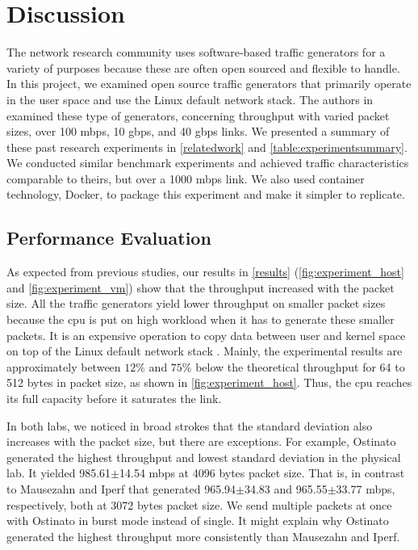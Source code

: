 \chapter{Discussion}\label{discussion}

The network research community uses software-based traffic generators for a variety of purposes because these are often open sourced and flexible to handle.
In this project, we examined open source traffic generators that primarily operate in the user space and use the Linux default network stack.
The authors in \cite{kolahi2011performance, srivastava2014evaluation, srivastava2014comparative} examined these type of generators, concerning throughput with varied packet sizes, over 100 \acrshort{mbps}, 10 \acrshort{gbps}, and 40 \acrshort{gbps} links.
We presented a summary of these past research experiments in \cref{relatedwork} and \cref{table:experimentsummary}.
We conducted similar benchmark experiments and achieved traffic characteristics comparable to theirs, but over a 1000 \acrshort{mbps} link.
We also used container technology, Docker, to package this experiment and make it simpler to replicate.

\section{Performance Evaluation}

As expected from previous studies, our results in \cref{results} (\cref{fig:experiment_host} and \cref{fig:experiment_vm}) show that the throughput increased with the packet size.
All the traffic generators yield lower throughput on smaller packet sizes because the \acrshort{cpu} is put on high workload when it has to generate these smaller packets.
It is an expensive operation to copy data between user and kernel space on top of the Linux default network stack \cite{raumer2015performance}.
Mainly, the experimental results are approximately between $12\%$ and $75\%$ below the theoretical throughput for 64 to 512 bytes in packet size, as shown in \cref{fig:experiment_host}.
Thus, the \acrshort{cpu} reaches its full capacity before it saturates the link.

\skippara In both labs, we noticed in broad strokes that the standard deviation also increases with the packet size, but there are exceptions.
For example, Ostinato generated the highest throughput and lowest standard deviation in the physical lab.
It yielded 985.61$\pm$14.54 \acrshort{mbps} at 4096 bytes packet size.
That is, in contrast to Mausezahn and Iperf that generated 965.94$\pm$34.83 and 965.55$\pm$33.77 \acrshort{mbps}, respectively, both at 3072 bytes packet size.
We send multiple packets at once with Ostinato in burst mode instead of single.
It might explain why Ostinato generated the highest throughput more consistently than Mausezahn and Iperf.

